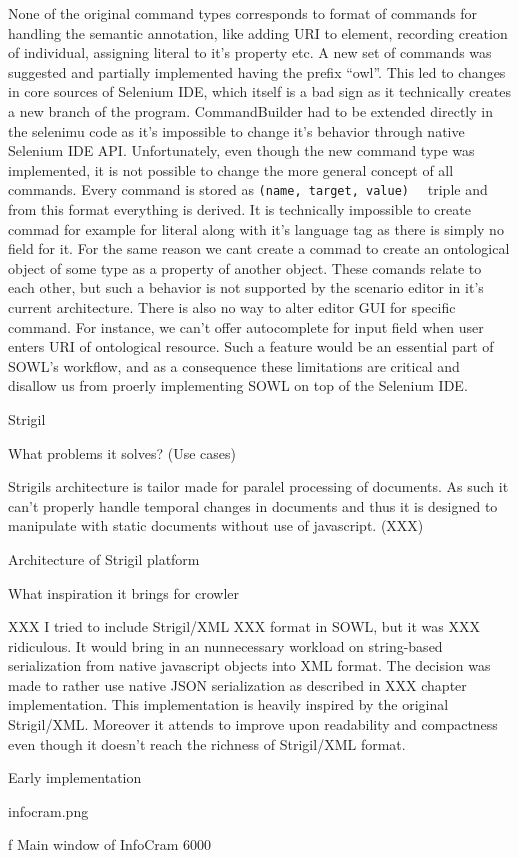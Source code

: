 None of the original command types corresponds to format of commands for
handling the semantic annotation, like adding URI to element, recording
creation of individual, assigning literal to it's property etc. A new set of
commands was suggested and partially implemented having the prefix ``owl''.
This led to changes in core sources of Selenium IDE, which itself is a bad sign
as it technically creates a new branch of the program. CommandBuilder had to be
extended directly in the selenimu code as it's impossible to change it's
behavior through native Selenium IDE API. Unfortunately, even though the new
command type was implemented, it is not possible to change the more general
concept of all commands. Every command is stored as {\tt (name, target, value)
}~ triple and from this format everything is
derived. It is technically impossible to create commad for example for literal
along with it's language tag as there is simply no field for it. For the same
reason we cant create a commad to create an ontological object of some type as
a property of another object.  These comands relate to each other, but such a
behavior is not supported by the scenario editor in it's current architecture.
There is also no way to alter editor GUI for specific command. For instance, we
can't offer autocomplete for input field when user enters URI of ontological
resource. Such a feature would be an essential part of SOWL's workflow, and as
a consequence these limitations are critical and disallow us from proerly
implementing SOWL on top of the Selenium IDE. 


\sec Strigil




\secc What problems it solves? (Use cases)

Strigils architecture is tailor made for paralel processing of documents. As
such it can't properly handle temporal changes in documents and thus it is
designed to manipulate with static documents without use of javascript. (XXX)

\secc Architecture of Strigil platform

\secc What inspiration it brings for crowler

XXX I tried to include Strigil/XML XXX format in SOWL, but it was XXX
ridiculous. It would bring in an nunnecessary workload on string-based
serialization from native javascript objects into XML format. The decision was
made to rather use native JSON serialization as described in XXX chapter
implementation. This implementation is heavily inspired by the original
Strigil/XML. Moreover it attends to improve upon readability and compactness
even though it doesn't reach the richness of Strigil/XML format. 

%




\sec Early implementation

\midinsert
\picw=7cm \cinspic infocram.png
\caption/f Main window of InfoCram 6000
\endinsert



